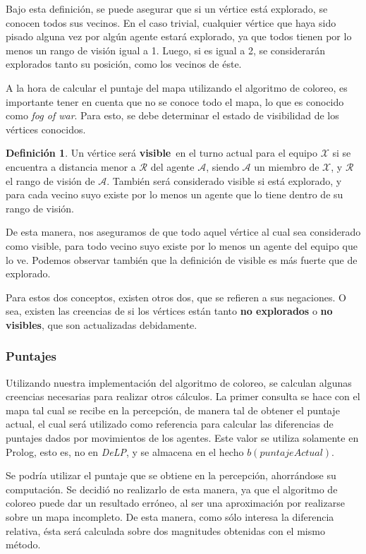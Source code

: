 \documentclass[oneside]{book}
\theoremstyle{definition}
\newtheorem{definicion}{Definición}[section]
\theoremstyle{example}
\newcommand{\DLP}{\mbox{\textit{DeLP}}}
\newcommand{\lit}[1]{\mbox{$ #1$}}
\begin{document}
Bajo esta definición, se puede asegurar que si un vértice está explorado, se 
conocen todos sus vecinos. En el caso trivial, cualquier vértice que haya sido
pisado alguna vez por algún agente estará explorado, ya que todos tienen por lo 
menos un rango de visión igual a 1. Luego, si es igual a 2, se considerarán
explorados tanto su posición, como los vecinos de éste.

A la hora de calcular el puntaje del mapa utilizando el algoritmo de coloreo,
es importante tener en cuenta que no se conoce todo el mapa, lo que es conocido 
como \textit{fog of war}. Para esto, se debe determinar el estado de visibilidad
de los vértices conocidos. 

\begin{definicion}
Un vértice será \textbf{visible}\ en el turno actual para el equipo $\mathcal 
X$ si se encuentra a distancia menor a $\mathcal R$ del agente $\mathcal A$, 
siendo $\mathcal A$ un miembro de $\mathcal X$, y $\mathcal R$ el rango de 
visión de $\mathcal A$. También será considerado visible si está explorado, y 
para cada vecino suyo existe por lo menos un agente que lo tiene dentro de su 
rango de visión.
\end{definicion}

De esta manera, nos aseguramos de que todo aquel vértice al cual sea considerado 
como visible, para todo vecino suyo existe por lo menos un agente del equipo 
que lo ve. Podemos observar también que la definición de visible es más fuerte que
de explorado.

Para estos dos conceptos, existen otros dos, que se refieren a sus negaciones. O 
sea, existen las creencias de si los vértices están tanto \textbf{no explorados}
o \textbf{no visibles}, que son actualizadas debidamente.


\subsubsection{Puntajes}

Utilizando nuestra implementación del algoritmo de coloreo, se calculan algunas
creencias necesarias para realizar otros cálculos. La primer consulta se hace con
el mapa tal cual se recibe en la percepción, de manera tal de obtener el puntaje
actual, el cual será utilizado como referencia para calcular las diferencias de
puntajes dados por movimientos de los agentes. Este valor se utiliza solamente
en Prolog, esto es, no en \DLP, y se almacena en el hecho \lit{b(puntajeActual)}.

Se podría utilizar el puntaje que se obtiene en la percepción, ahorrándose
su computación. Se decidió no realizarlo de esta manera, ya que el algoritmo de 
coloreo puede dar un resultado erróneo, al ser una aproximación por realizarse
sobre un mapa incompleto. De esta manera, como sólo interesa la diferencia 
relativa, ésta será calculada sobre dos magnitudes obtenidas con el mismo 
método.
\end{document}
